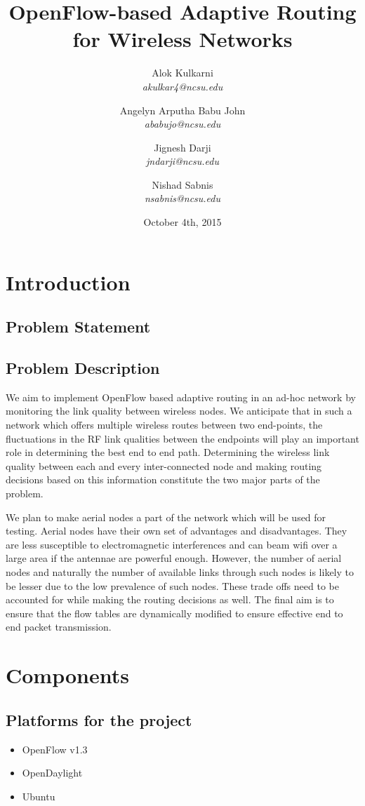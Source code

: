 \documentclass{article}
\title{OpenFlow-based Adaptive Routing for Wireless Networks}
\author{
    Alok Kulkarni \\
    \textit{akulkar4@ncsu.edu}
    \and
    Angelyn Arputha Babu John \\
    \textit{ababujo@ncsu.edu}
    \and
    Jignesh Darji \\
    \textit{jndarji@ncsu.edu}
    \and 
    Nishad Sabnis \\
    \textit{nsabnis@ncsu.edu}
}
\date{October 4th, 2015}
\begin{document}
\maketitle
\section{Introduction}
\subsection{Problem Statement}
\subsection{Problem Description}
\par We aim to implement OpenFlow based adaptive routing in an ad-hoc network by monitoring the link quality between wireless
nodes. We anticipate that in such a network which offers multiple wireless routes between two end-points, the
fluctuations in the RF link qualities between the endpoints will play an important role in determining the best end to
end path. Determining the wireless link quality between each and every inter-connected node and making routing decisions
based on this information constitute the two major parts of the problem. 
\par We plan to make aerial nodes a part of the network which will be used for testing. Aerial nodes have their own set of
advantages and disadvantages. They are less susceptible to electromagnetic interferences and can beam wifi over a large
area if the antennae are powerful enough. However, the number of aerial nodes and naturally the number of available
links through such nodes is likely to be lesser due to the low prevalence of such nodes. These trade offs need to be
accounted for while making the routing decisions as well. The final aim is to ensure that the flow tables are
dynamically modified to ensure effective end to end packet transmission. 
\section{Components}
\subsection{Platforms for the project}
\begin{itemize}
\item OpenFlow v1.3
\item OpenDaylight
\item Ubuntu
\end{itemize}
\end{document}
